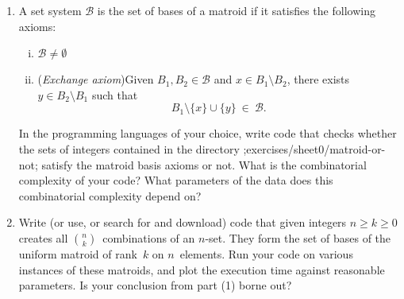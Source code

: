 \documentclass[11pt]{amsart}
\newcommand{\defn}[1]{{\color{blue}#1}}
\begin{document}
\bigskip
\begin{enumerate}
\item
  A set system $\mathcal B$ is the set of bases of a matroid if it satisfies the following axioms:
  \begin{enumerate}[(i)]
  \item $\mathcal B\ne\emptyset$
  \item (\emph{Exchange axiom})\newline Given $B_1,B_2\in\mathcal B$ and $x\in B_1\setminus B_2$, there exists $y\in B_2\setminus B_1$ such that
    \[
      B_1 \setminus \{x\} \cup \{y\}
      \ \in\
      \mathcal B.
    \]
  \end{enumerate}

  In the programming languages of your choice,
  write code that checks whether the sets of integers contained in the directory ;exercises/sheet0/matroid-or-not; satisfy the matroid basis axioms or not.
  What is the combinatorial complexity of your code?
  What parameters of the data does this combinatorial complexity depend on?

  \medskip
\item
  Write (or use, or search for and download) code that given integers $n\ge k\ge0$ creates all $\binom{n}{k}$~combinations of an $n$-set.
  They form the set of bases of the \defn{uniform matroid of rank~$k$ on $n$~elements}.
  Run your code on various instances of these matroids, and plot the execution time against reasonable parameters.
  Is your conclusion from part (1) borne out?
\end{enumerate}
\end{document}
